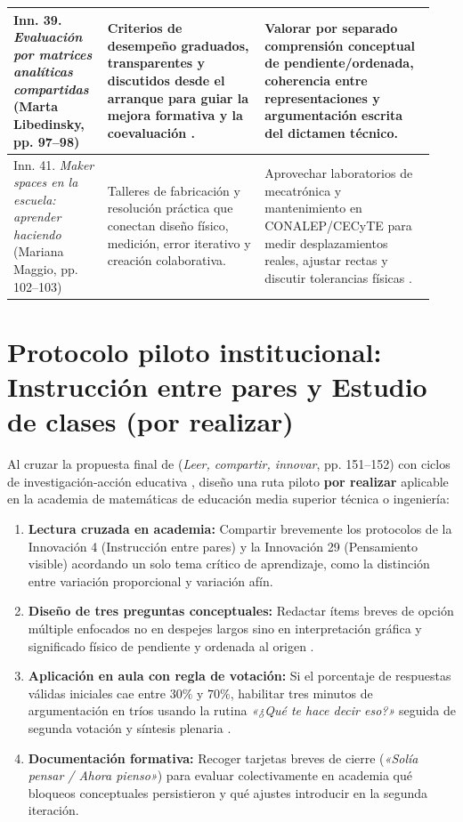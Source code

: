 \documentclass[spanish,letterpaper,oneside]{article}
\begin{document}
{\begin{longtable}{|>{\raggedright\arraybackslash}p{0.21\linewidth}|>{\raggedright\arraybackslash}p{0.35\linewidth}|>{\raggedright\arraybackslash}p{0.38\linewidth}|}
Inn. 39. \textit{Evaluación por matrices analíticas compartidas} (Marta Libedinsky, pp. 97--98) & Criterios de desempeño graduados, transparentes y discutidos desde el arranque para guiar la mejora formativa y la coevaluación \citep{eef2021feedback}. & Valorar por separado comprensión conceptual de pendiente/ordenada, coherencia entre representaciones y argumentación escrita del dictamen técnico. \\\hline
Inn. 41. \textit{Maker spaces en la escuela: aprender haciendo} (Mariana Maggio, pp. 102--103) & Talleres de fabricación y resolución práctica que conectan diseño físico, medición, error iterativo y creación colaborativa. & Aprovechar laboratorios de mecatrónica y mantenimiento en CONALEP/CECyTE para medir desplazamientos reales, ajustar rectas y discutir tolerancias físicas \citep{conalep2025mecatronica}. \\\hline
\end{longtable}}

\section{Protocolo piloto institucional: Instrucción entre pares y Estudio de clases (por realizar)}
Al cruzar la propuesta final de \citet{rivas2017innovaciones} (\textit{Leer, compartir, innovar}, pp. 151--152) con ciclos de investigación-acción educativa \citep{restrepo2004investigacion}, diseño una ruta piloto \textbf{por realizar} aplicable en la academia de matemáticas de educación media superior técnica o ingeniería:
\begin{enumerate}
  \item \textbf{Lectura cruzada en academia:} Compartir brevemente los protocolos de la Innovación 4 (Instrucción entre pares) y la Innovación 29 (Pensamiento visible) acordando un solo tema crítico de aprendizaje, como la distinción entre variación proporcional y variación afín.
  \item \textbf{Diseño de tres preguntas conceptuales:} Redactar ítems breves de opción múltiple enfocados no en despejes largos sino en interpretación gráfica y significado físico de pendiente y ordenada al origen \citep{sawyer2008optimizing}.
  \item \textbf{Aplicación en aula con regla de votación:} Si el porcentaje de respuestas válidas iniciales cae entre $30\%$ y $70\%$, habilitar tres minutos de argumentación en tríos usando la rutina \textit{«¿Qué te hace decir eso?»} seguida de segunda votación y síntesis plenaria \citep{mazur1997peer,ritchhart2014hacer}.
  \item \textbf{Documentación formativa:} Recoger tarjetas breves de cierre (\textit{«Solía pensar / Ahora pienso»}) para evaluar colectivamente en academia qué bloqueos conceptuales persistieron y qué ajustes introducir en la segunda iteración.
\end{enumerate}
\end{document}
